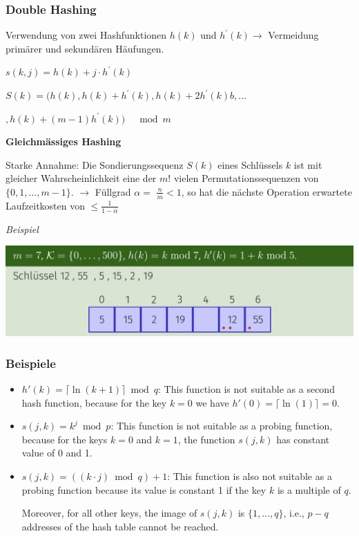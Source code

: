 \begin{sectionbox}
\subsubsection{Double Hashing}\par\smallskip
Verwendung von zwei Hashfunktionen $h(k)$ und $h^{\prime}(k) \rightarrow$ Vermeidung primärer und sekundären Häufungen.
\begin{center}
    $s(k, j)=h(k)+j \cdot h^{\prime}(k)$\par
    $S(k)=(h(k), h(k)+h^{\prime}(k), h(k)+2 h^{\prime}(k)b, \ldots$ \par
    $, h(k)+(m-1) h^{\prime}(k)) \quad \bmod m$
\end{center}\par\smallskip

\textbf{Gleichmässiges Hashing}\par
Starke Annahme: Die Sondierungssequenz $S(k)$ eines Schlüssels $k$ ist mit gleicher Wahrscheinlichkeit eine der $m !$ vielen Permutationssequenzen von $\{0,1, \ldots, m-1\}$.
$\rightarrow$ Füllgrad $\alpha=$ $\frac{n}{m}<1$, so hat die nächste Operation erwartete Laufzeitkosten von $\leq \frac{1}{1-\alpha}$\par\smallskip
\textit{Beispiel}\par
\begin{center}
    \includegraphics[width = 0.9\columnwidth]{../img/BespDoubHash.png}
\end{center}
\end{sectionbox}
\vspace{-4pt}
\begin{sectionbox}
\subsubsection{Beispiele}\par\smallskip
\begin{itemize}
    \item $h'(k) = \lceil \ln (k+1) \rceil \bmod q$: This function is not suitable as a second hash function, because for the key $k = 0$ we have $h'(0) = \lceil \ln (1) \rceil = 0$.
    \item $s(j,k) = k^j \bmod p$: This function is not suitable as a probing function, because for the keys $k = 0$ and $k = 1$, the function $s(j, k)$ has constant value of 0 and 1.
    \item $s(j,k) = ((k \cdot j) \bmod q) + 1$: This function is also not suitable as a probing function because its value is constant 1 if the key $k$ is a multiple of $q$.\par Moreover, for all other keys, the image of $s(j, k)$ is $\{1, . . . , q\}$, i.e., $p - q$ addresses of the hash table cannot be reached.
\end{itemize}

\end{sectionbox}